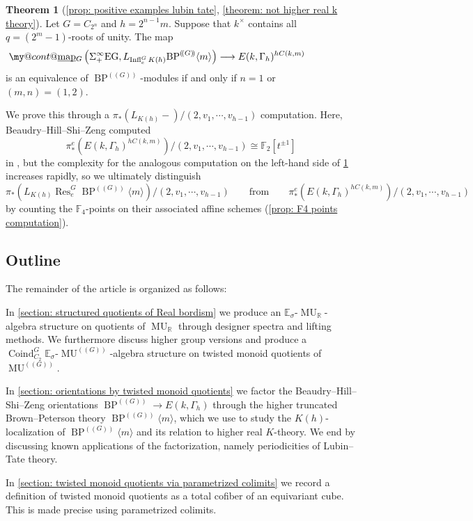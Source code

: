 \documentclass[a4paper, 10pt]{article}
\makeatletter
\newcommand{\E}{\mathbb E}  %
\newcommand{\F}{\mathbb F}
\newcommand{\MU}{\operatorname{MU}}
\newcommand{\MUR}{{\MU_{\mathbb{R}}}}
\newcommand{\MUG}{{\MU^{(\!(G)\!)}}}
\newcommand{\BPG}{{\BP^{(\!(G)\!)}}}
\newcommand{\BPGm}{{\BP^{(\!(G)\!)}}\langle m\rangle}
\newcommand{\BP}{\operatorname{BP}}
\newcommand{\Res}{\operatorname{Res}}
\newcommand{\map}{\operatorname{map}}
\newcommand{\Infl}{\operatorname{Infl}}
\newcommand{\Coind}{\operatorname{Coind}}
\DeclareRobustCommand{\myuline}[2][0pt]{%
  \ifmmode
    \uline{\hphantom{#2}\kern-#1}%
    \kern#1%
    \mathllap{\mathpalette\my@cont@{#2}}%
  \else
    \uline{\phantom{#2}\kern-#1}%
    \kern#1%
    \llap{\contour{white}{#2}}%
  \fi
}
\newcommand{\ul}{\myuline}
\newcommand{\my@cont@}[2]{\contour{white}{\mbox{$\m@th#1#2$}}}
\theoremstyle{definition}
\newtheorem{mainthm}{Theorem}
\makeatother
\begin{document}
\begin{mainthm}[\cref{prop: positive examples lubin tate}, \cref{theorem: not higher real k theory}] \label{mainthm: characterization}
    Let $G = C_{2^n}$ and $h = 2^{n-1}m$. Suppose that $k^{\times}$ contains all $q = (2^m-1)$-roots of unity. The map
    \[ \ul{\map}_G \left(\Sigma_+^{\infty} \mathrm{EG}, L_{\Infl_e^G K(h)} \BPGm \right) \longrightarrow E(k,\Gamma_h)^{hC(k,m)} \]
    is an equivalence of $\BPG$-modules if and only if $n = 1$ or $(m,n) = (1,2)$.
\end{mainthm}

We prove this through a $\pi_*(L_{K(h)}-)/(2,v_1,\cdots, v_{h-1})$ computation. Here, Beaudry--Hill--Shi--Zeng computed 
\[ \pi_*^e \left(E(k,\Gamma_h)^{hC(k,m)} \right)/(2,v_1, \cdots, v_{h-1}) \cong \F_2[t^{\pm 1}] \] 
in \cite[Proposition 7.1]{beaudryHillShiZeng2021modelsLubinTate}, but the complexity for the analogous computation on the left-hand side of \cref{mainthm: characterization} increases rapidly, so we ultimately distinguish
\[ \pi_* \left(L_{K(h)} \Res_e^G \BPGm \right)/(2,v_1,\cdots, v_{h-1}) \qquad \text{from} \qquad \pi_*^e \left(E(k,\Gamma_h)^{hC(k,m)} \right)/(2,v_1,\cdots, v_{h-1}) \]
by counting the $\F_4$-points on their associated affine schemes (\cref{prop: F4 points computation}).

\subsection*{Outline}
The remainder of the article is organized as follows:

In \cref{section: structured quotients of Real bordism} we produce an $\E_{\sigma}$-$\MUR$-algebra structure on quotients of $\MUR$ through designer spectra and lifting methods. We furthermore discuss higher group versions and produce a $\Coind_{C_2}^G \E_{\sigma}$-$\MUG$-algebra structure on twisted monoid quotients of $\MUG$.

In \cref{section: orientations by twisted monoid quotients} we factor the Beaudry--Hill--Shi--Zeng orientations $\BPG \to E(k, \Gamma_h)$ through the higher truncated Brown--Peterson theory $\BPGm$, which we use to study the $K(h)$-localization of $\BPGm$ and its relation to higher real $K$-theory. We end by discussing known applications of the factorization, namely periodicities of Lubin--Tate theory.

In \cref{section: twisted monoid quotients via parametrized colimits} we record a definition of twisted monoid quotients as a total cofiber of an equivariant cube. This is made precise using parametrized colimits.
\end{document}
